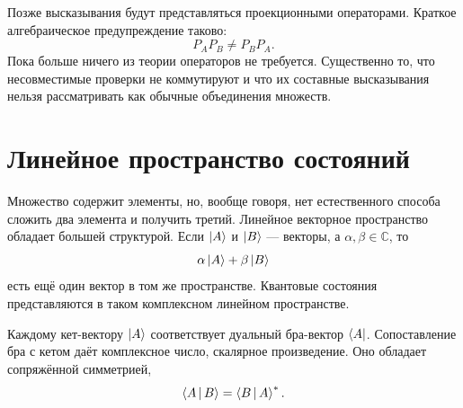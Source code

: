 \begin{classroomqa}
\end{classroomqa}

Позже высказывания будут представляться проекционными операторами. Краткое алгебраическое предупреждение таково:
\begin{equation}
P_A P_B\ne P_B P_A.
\end{equation}
Пока больше ничего из теории операторов не требуется. Существенно то, что несовместимые проверки не коммутируют и что их составные высказывания нельзя рассматривать как обычные объединения множеств.

\begin{classroomqa}
\end{classroomqa}

\section{Линейное пространство состояний}

Множество содержит элементы, но, вообще говоря, нет естественного способа сложить два элемента и получить третий. Линейное векторное пространство обладает большей структурой. Если \(\left\lvert A\right\rangle\) и \(\left\lvert B\right\rangle\) — векторы, а \(\alpha,\beta\in\mathbb C\), то
\begin{equation}
\alpha\left\lvert A\right\rangle+\beta\left\lvert B\right\rangle
\end{equation}
есть ещё один вектор в том же пространстве. Квантовые состояния представляются в таком комплексном линейном пространстве.

Каждому кет-вектору \(\left\lvert A\right\rangle\) соответствует дуальный бра-вектор \(\left\langle A\right\rvert\). Сопоставление бра с кетом даёт комплексное число, скалярное произведение. Оно обладает сопряжённой симметрией,
\begin{equation}
\left\langle A\,\middle|\,B\right\rangle=\left\langle B\,\middle|\,A\right\rangle^{*}.
\label{eq:conjugate-symmetry}
\end{equation}

